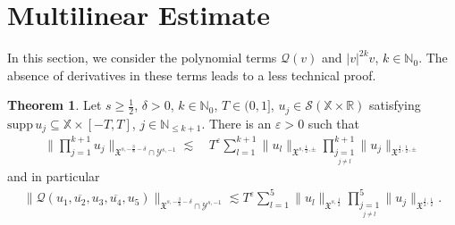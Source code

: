 \documentclass[reqno]{amsart}
\theoremstyle{Definitionl}
\theoremstyle{Definitionk}
\theoremstyle{definition}
\theoremstyle{Satzk}
\newtheorem{satzk}[defi]{Theorem}
\theoremstyle{Satzl}
\theoremstyle{Bemerkung}
\begin{document}
\section{Multilinear Estimate}
In this section, we consider the polynomial terms $\mathcal Q(v)$ and $|v|^{2k}v$, $k\in\mathbb N_0$. The absence of derivatives in these terms leads to a less technical proof.
\begin{satzk}
Let $s\ge\frac12$, $\delta>0$, $k\in\mathbb N_0$, $T\in(0,1]$, $u_j\in\mathcal S(\mathbb X\times\mathbb R)$ satisfying $\mathrm{supp}\,u_j\subseteq\mathbb X\times[-T,T]$, $j\in\mathbb N_{\le k+1}$. There is an $\varepsilon>0$ such that
\begin{align}
\Big\|\prod_{j=1}^{k+1}u_j\Big\|_{\mathfrak X^{s,-\frac38-\delta}\cap\mathcal Y^{s,-1}}\lesssim&\, T^{\varepsilon}\sum_{l=1}^{k+1}\|u_l\|_{\mathfrak X^{s,\frac12,\pm}}\prod_{\underset{j\ne l}{j=1}}^{k+1}\|u_j\|_{\mathfrak X^{\frac12,\frac12,\pm}}\label{multi}
\end{align}
and in particular
\begin{align}
\big\|\mathcal Q(u_1,\overline {u_2},u_3,\overline{u_4},u_5)\big\|_{\mathfrak X^{s,-\frac38-\delta}\cap\mathcal Y^{s,-1}}\lesssim T^{\varepsilon}\sum_{l=1}^5\|u_l\|_{\mathfrak X^{s,\frac12}}\prod_{\underset{j\ne l}{j=1}}^5\|u_j\|_{\mathfrak X^{\frac12,\frac12}}\label{27}.
\end{align}
\end{satzk}
\end{document}
